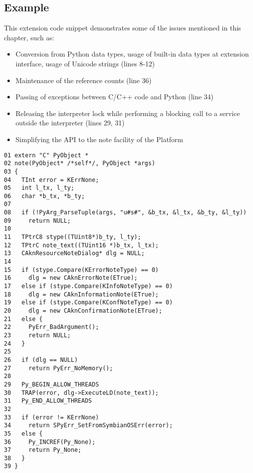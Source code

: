 \subsection{Example}
This extension code snippet demonstrates some of the issues mentioned in this chapter, such as:

\begin{itemize}
\item Conversion from Python data types, usage of built-in data types at extension interface, usage of Unicode strings (lines 8-12)
\item Maintenance of the reference counts (line 36)
\item Passing of exceptions between C/C++ code and Python (line 34)
\item Releasing the interpreter lock while performing a blocking call to a service outside the interpreter (lines 29, 31)
\item Simplifying the API to the note facility of the Platform
\end{itemize}

\begin{verbatim}
01 extern "C" PyObject *
02 note(PyObject* /*self*/, PyObject *args)
03 {
04   TInt error = KErrNone;
05   int l_tx, l_ty;
06   char *b_tx, *b_ty;
07   
08   if (!PyArg_ParseTuple(args, "u#s#", &b_tx, &l_tx, &b_ty, &l_ty))
09     return NULL;
10 
11   TPtrC8 stype((TUint8*)b_ty, l_ty);
12   TPtrC note_text((TUint16 *)b_tx, l_tx);
13   CAknResourceNoteDialog* dlg = NULL;
14 
15   if (stype.Compare(KErrorNoteType) == 0)
16     dlg = new CAknErrorNote(ETrue);
17   else if (stype.Compare(KInfoNoteType) == 0)
18     dlg = new CAknInformationNote(ETrue);
19   else if (stype.Compare(KConfNoteType) == 0)
20     dlg = new CAknConfirmationNote(ETrue);
21   else {
22     PyErr_BadArgument();
23     return NULL;
24   }
25 
26   if (dlg == NULL)
27     return PyErr_NoMemory();
28   
29   Py_BEGIN_ALLOW_THREADS
30   TRAP(error, dlg->ExecuteLD(note_text));
31   Py_END_ALLOW_THREADS
32 
33   if (error != KErrNone)
34     return SPyErr_SetFromSymbianOSErr(error);
35   else {
36     Py_INCREF(Py_None);
37     return Py_None;
38   }
39 }
\end{verbatim}

